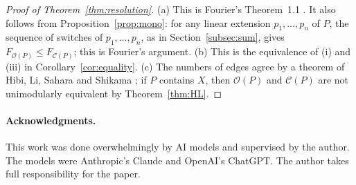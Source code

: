 \documentclass[11pt]{article}
\theoremstyle{definition}
\theoremstyle{remark}
\newcommand{\OO}{\mathcal O}
\newcommand{\CC}{\mathcal C}
\begin{document}
\begin{proof}[Proof of Theorem~\ref{thm:resolution}]
(a) This is Fourier's Theorem~1.1 \cite{Fourier}. It also follows from Proposition~\ref{prop:mono}: for any linear
extension $p_1,\ldots,p_n$ of $P$, the sequence of switches of $p_1,\ldots,p_n$, as in Section~\ref{subsec:sum},
gives
$F_{\OO(P)}\leq F_{\CC(P)}$; this is Fourier's argument. (b) This is the equivalence of (i) and (iii) in
Corollary~\ref{cor:equality}. (c) The numbers of edges agree by a theorem of Hibi, Li, Sahara and Shikama \cite[Theorem~2.1]{HLSS}; if $P$ contains
$X$, then $\OO(P)$ and $\CC(P)$ are not unimodularly equivalent by Theorem~\ref{thm:HL}.
\end{proof}

\paragraph{Acknowledgments.}
This work was done overwhelmingly by AI models and supervised by the
author. The models were Anthropic's Claude and OpenAI's ChatGPT. The
author takes full responsibility for the paper.
\end{document}
